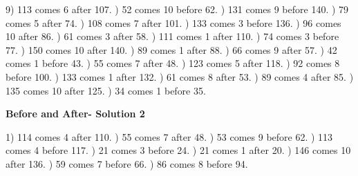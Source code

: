 \documentclass{article}%
\begin{document}
9) 113 comes 6 after 107.%
) 52 comes 10 before 62.%
) 131 comes 9 before 140.%
) 79 comes 5 after 74.%
) 108 comes 7 after 101.%
) 133 comes 3 before 136.%
) 96 comes 10 after 86.%
) 61 comes 3 after 58.%
) 111 comes 1 after 110.%
) 74 comes 3 before 77.%
) 150 comes 10 after 140.%
) 89 comes 1 after 88.%
) 66 comes 9 after 57.%
) 42 comes 1 before 43.%
) 55 comes 7 after 48.%
) 123 comes 5 after 118.%
) 92 comes 8 before 100.%
) 133 comes 1 after 132.%
) 61 comes 8 after 53.%
) 89 comes 4 after 85.%
) 135 comes 10 after 125.%
) 34 comes 1 before 35.%
\newline%
\newpage%
\large%
\begin{center}%
\textbf{Before and After- Solution 2}%
\newline%
\end{center} \normalsize%
1) 114 comes 4 after 110.%
) 55 comes 7 after 48.%
) 53 comes 9 before 62.%
) 113 comes 4 before 117.%
) 21 comes 3 before 24.%
) 21 comes 1 after 20.%
) 146 comes 10 after 136.%
) 59 comes 7 before 66.%
) 86 comes 8 before 94.%
\newline%
\end{document}
